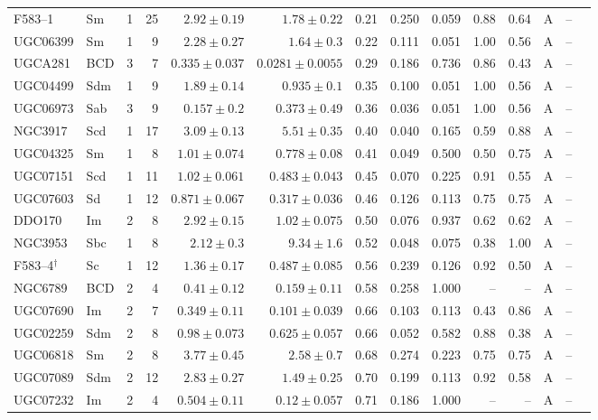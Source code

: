 \documentclass[9pt]{extarticle}
\begin{document}
{\begin{longtable}{lllrrrrrrrrcrl}
F583--1 & Sm & 1 & 25 & $2.92\pm0.19$ & $1.78\pm0.22$ & 0.21 & 0.250 & 0.059 & 0.88 & 0.64 & A & -- & \\
UGC06399 & Sm & 1 & 9 & $2.28\pm0.27$ & $1.64\pm0.3$ & 0.22 & 0.111 & 0.051 & 1.00 & 0.56 & A & -- & \\
UGCA281 & BCD & 3 & 7 & $0.335\pm0.037$ & $0.0281\pm0.0055$ & 0.29 & 0.186 & 0.736 & 0.86 & 0.43 & A & -- & \\
UGC04499 & Sdm & 1 & 9 & $1.89\pm0.14$ & $0.935\pm0.1$ & 0.35 & 0.100 & 0.051 & 1.00 & 0.56 & A & -- & \\
UGC06973 & Sab & 3 & 9 & $0.157\pm0.2$ & $0.373\pm0.49$ & 0.36 & 0.036 & 0.051 & 1.00 & 0.56 & A & -- & \\
NGC3917 & Scd & 1 & 17 & $3.09\pm0.13$ & $5.51\pm0.35$ & 0.40 & 0.040 & 0.165 & 0.59 & 0.88 & A & -- & \\
UGC04325 & Sm & 1 & 8 & $1.01\pm0.074$ & $0.778\pm0.08$ & 0.41 & 0.049 & 0.500 & 0.50 & 0.75 & A & -- & \\
UGC07151 & Scd & 1 & 11 & $1.02\pm0.061$ & $0.483\pm0.043$ & 0.45 & 0.070 & 0.225 & 0.91 & 0.55 & A & -- & \\
UGC07603 & Sd & 1 & 12 & $0.871\pm0.067$ & $0.317\pm0.036$ & 0.46 & 0.126 & 0.113 & 0.75 & 0.75 & A & -- & \\
DDO170 & Im & 2 & 8 & $2.92\pm0.15$ & $1.02\pm0.075$ & 0.50 & 0.076 & 0.937 & 0.62 & 0.62 & A & -- & \\
NGC3953 & Sbc & 1 & 8 & $2.12\pm0.3$ & $9.34\pm1.6$ & 0.52 & 0.048 & 0.075 & 0.38 & 1.00 & A & -- & \\
F583--4$^\dagger$ & Sc & 1 & 12 & $1.36\pm0.17$ & $0.487\pm0.085$ & 0.56 & 0.239 & 0.126 & 0.92 & 0.50 & A & -- & \\
NGC6789 & BCD & 2 & 4 & $0.41\pm0.12$ & $0.159\pm0.11$ & 0.58 & 0.258 & 1.000 & -- & -- & A & -- & \\
UGC07690 & Im & 2 & 7 & $0.349\pm0.11$ & $0.101\pm0.039$ & 0.66 & 0.103 & 0.113 & 0.43 & 0.86 & A & -- & \\
UGC02259 & Sdm & 2 & 8 & $0.98\pm0.073$ & $0.625\pm0.057$ & 0.66 & 0.052 & 0.582 & 0.88 & 0.38 & A & -- & \\
UGC06818 & Sm & 2 & 8 & $3.77\pm0.45$ & $2.58\pm0.7$ & 0.68 & 0.274 & 0.223 & 0.75 & 0.75 & A & -- & \\
UGC07089 & Sdm & 2 & 12 & $2.83\pm0.27$ & $1.49\pm0.25$ & 0.70 & 0.199 & 0.113 & 0.92 & 0.58 & A & -- & \\
UGC07232 & Im & 2 & 4 & $0.504\pm0.11$ & $0.12\pm0.057$ & 0.71 & 0.186 & 1.000 & -- & -- & A & -- & \\

\end{longtable}}
\end{document}
